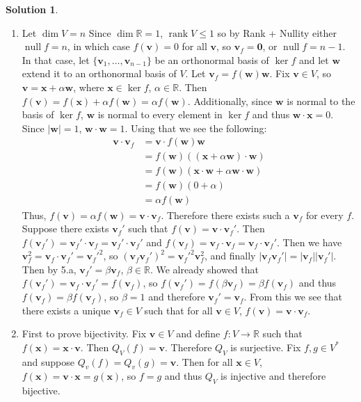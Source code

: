 \documentclass[11pt]{article}
\theoremstyle{definition}
\newtheorem*{solution}{Solution}
\newcommand{\R}{\mathbb{R}}
\DeclareMathOperator{\nul}{null}
\DeclareMathOperator{\rank}{rank}
\newcommand{\vv}{\mathbf{v}}
\newcommand{\vw}{\mathbf{w}}
\newcommand{\vx}{\mathbf{x}}
\newcommand{\vzero}{\mathbf{0}}
\begin{document}
    \begin{solution}
        \begin{enumerate}[label = \alph*)]
            \item Let $\dim V = n$ Since $\dim \R = 1$, $\rank V \le 1$ so by Rank + Nullity either $\nul f = n$, in which case $f(\vv) = 0$ for all $\vv$, so $\vv_f = \vzero$, or $\nul f = n-1$. In that case, let $\{\vv_1, \dots, \vv_{n-1}\}$ be an orthonormal basis of $\ker f$ and let $\vw$ extend it to an orthonormal basis of $V$. Let $\vv_f = f(\vw)\vw$. Fix $\vv \in V$, so $\vv = \vx + \alpha \vw$, where $\vx \in \ker f$, $\alpha \in \R$. Then $f(\vv) = f(\vx) + \alpha f(\vw) = \alpha f(\vw)$. Additionally, since $\vw$ is normal to the basis of $\ker f$, $\vw$ is normal to every element in $\ker f$ and thus $\vw \cdot \vx = 0$. Since $|\vw| = 1$, $\vw \cdot \vw = 1$. Using that we see the following:
                \begin{align*}
                    \vv \cdot \vv_f &= \vv \cdot f(\vw)\vw\\
                    &= f(\vw)((\vx + \alpha\vw)\cdot \vw)\\
                    &= f(\vw)(\vx \cdot \vw + \alpha\vw\cdot\vw)\\
                    &= f(\vw)(0 + \alpha)\\
                    &= \alpha f(\vw)
                \end{align*}
            Thus, $f(\vv) = \alpha f(\vw) = \vv \cdot \vv_f$. Therefore there exists such a $\vv_f$ for every $f$. Suppose there exists $\vv_f'$ such that $f(\vv) = \vv \cdot \vv_f'$. Then $f(\vv_f') = \vv_f' \cdot \vv_f = \vv_f' \cdot \vv_f'$ and $f(\vv_f) = \vv_f \cdot \vv_f = \vv_f \cdot \vv_f'$. Then we have $\vv_f^2 = \vv_f\cdot \vv_f' = \vv_f'^2$, so $(\vv_f\vv_f')^2 = \vv_f'^2\vv_f^2$, and finally $|\vv_f\vv_f'| = |\vv_f||\vv_f'|$. Then by 5.a, $\vv_f' = \beta \vv_f$, $\beta \in \R$. We already showed that $f(\vv_f') = \vv_f\cdot \vv_f' = f(\vv_f)$, so $f(\vv_f') = f(\beta \vv_f) = \beta f(\vv_f)$ and thus $f(\vv_f) = \beta f(\vv_f)$, so $\beta = 1$ and therefore $\vv_f' = \vv_f$. From this we see that there exists a unique $\vv_f \in V$ such that for all $\vv \in V$, $f(\vv) = \vv \cdot \vv_f$.
            \item First to prove bijectivity. Fix $\vv \in V$ and define $f:V \to \R$ such that $f(\vx) = \vx \cdot \vv$. Then $Q_V(f) = \vv$. Therefore $Q_V$ is surjective. Fix $f, g \in V^*$ and suppose $Q_v(f) = Q_v(g) = \vv$. Then for all $\vx \in V$, $f(\vx) = \vv \cdot \vx = g(\vx)$, so $f = g$ and thus $Q_V$ is injective and therefore bijective. 
            

\end{enumerate}
\end{solution}
\end{document}

